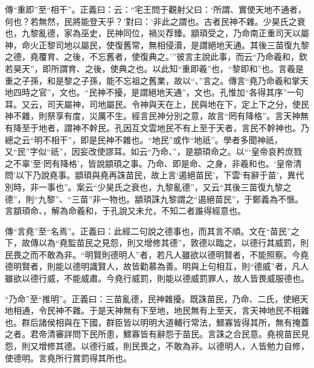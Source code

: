 {\noindent\zhuan{}\fzbyks 傳“重即”至“相干”。正義曰：云：“宅王問于觀射父曰：‘所謂、實使天地不通者，何也？若無然，民將能登天乎？’對曰：‘非此之謂也。古者民神不雜。少昊氏之衰也，九黎亂德，家為巫史，民神同位，禍災荐臻。顓頊受之，乃命南正重司天以屬神，命火正黎司地以屬民，使復舊常，無相侵瀆，是謂絕地天通。其後三苗復九黎之德，堯覆育、之後，不忘舊者，使復典之。’”彼言主說此事，而云“乃命羲和，欽若昊天”，即所謂育、之後，使典之也。以此知“重即羲”也，“黎即和”也。言羲是重之子孫，和是黎之子孫，能不忘祖之舊業，故以“、”言之。傳言“堯乃命羲和掌天地四時之官”，文也。“民神不擾，是謂絕地天通”，文也。孔惟加“各得其序”一句耳。又云，司天屬神，司地屬民。令神與天在上，民與地在下，定上下之分，使民神不雜，則祭享有度，災厲不生。經言民神分別之意，故言“罔有降格”。言天神無有降至于地者，謂神不幹民。孔因互文雲地民不有上至于天者，言民不幹神也。乃總之云“明不相干”，即是民神不雜也。“地民”或作“地祇”。學者多聞神祇，又“民”字似“祇”，因妄改使謬耳。如云“乃命、”，是顓頊命之。以“‘皇帝哀矜庶戮之不辜’至‘罔有降格’，皆說顓頊之事。乃命、即是命、之身，非羲和也。‘皇帝清問’以下乃說堯事。顓頊與堯再誅苗民，故上言‘遏絕苗民’，下雲‘有辭于苗’，異代別時，非一事也”。案云“少昊氏之衰也，九黎亂德”，又云“其後三苗復九黎之德”，則“九黎”、“三苗”非一物也。顓頊誅九黎謂之“遏絕苗民”，于鄭義為不愜。言顓頊命、，解為命羲和，于孔說又未允，不知二者誰得經意也。 \par}

{\noindent\zhuan{}\fzbyks 傳“言堯”至“名焉”。正義曰：此經二句說之德事也，而其言不順。文在“苗民”之下，故傳以為“堯監苗民之見怨，則又增修其德”，敦德以臨之，以德行其威罰，則民畏之而不敢為非。“明賢則德明人”者，若凡人雖欲以德明賢者，不能照察。今堯德明賢者，則能以德明識賢人，故皆勸慕為善。明與上句相互，則“德威”者，凡人雖欲以德行威，不能威肅。今堯行威罰，則能以德威罰罪人，故人皆畏威服德也。 \par}

{\noindent\shu{}\fzkt “乃命”至“推明”。正義曰：三苗亂德，民神雜擾。既誅苗民，乃命、二氏，使絕天地相通，令民神不雜。于是天神無有下至地，地民無有上至天，言天神地民不相雜也。群后諸侯相與在下國，群臣皆以明明大道輔行常法，鰥寡皆得其所，無有掩蓋之者。君帝清審詳問下民所患，鰥寡皆有辭怨于苗民。言誅之合民意。堯視苗民見怨，則又增修其德。以德行威，則民畏之，不敢為非。以德明人，人皆勉力自修，使德明。言堯所行賞罰得其所也。 \par}

